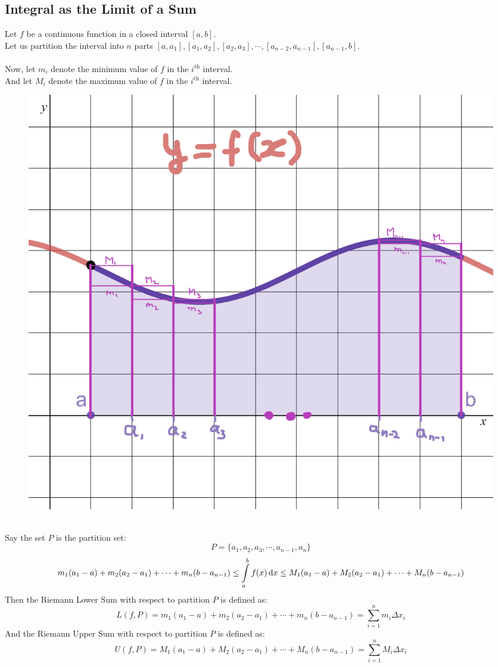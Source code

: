 \documentclass[14]{article}
\theoremstyle{definition}
\theoremstyle{case}
\begin{document}
\subsection{Integral as the Limit of a Sum}
Let $f$ be a continuous function in a closed interval $[a, b]$.\\ Let us partition the interval into $n$ parts $[a, a_1], [a_1, a_2], [a_2, a_3], \cdots, [a_{n-2}, a_{n-1}], [a_{n-1}, b]$.\\\\
Now, let $m_i$ denote the minimum value of $f$ in the $i^{\text{th}}$ interval.\\
And let $M_i$ denote the maximum value of $f$ in the $i^{\text{th}}$ interval.\\
\begin{figure}[h]
\includegraphics[scale=.24]{images/limit_of_sum}
\end{figure}\\
Say the set $P$ is the partition set:
\[P = \{a_1, a_2, a_3, \cdots , a_{n-1}, a_n\}\]
\[m_1 (a_1 - a) + m_2 (a_2 - a_1) + \cdots + m_n(b-a_{n-1}) \leq \int\limits_a^b f(x) \dif x \leq M_1(a_1 - a) + M_2 (a_2 - a_1) + \cdots + M_n(b - a_{n-1}) \]
Then the Riemann Lower Sum with respect to partition $P$ is defined as:
\[L(f, P) = m_1 (a_1 - a) + m_2 (a_2 - a_1) + \cdots + m_n(b-a_{n-1}) = \sum\limits_{i=1}^n m_i \Delta x_i\]
And the Riemann Upper Sum with respect to partition $P$ is defined as:
\[U(f, P) = M_1 (a_1 - a) + M_2 (a_2 - a_1) + \cdots + M_n(b-a_{n-1}) = \sum\limits_{i=1}^n M_i \Delta x_i \]
\pagebreak
\end{document}
